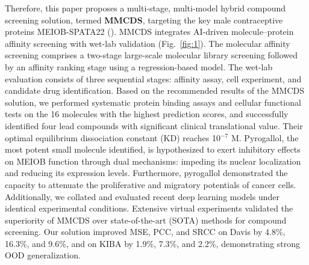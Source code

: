 \documentclass[unnumsec,webpdf,contemporary,large]{oup-authoring-template}%
\theoremstyle{thmstyleone}%
\theoremstyle{thmstyletwo}%
\theoremstyle{thmstylethree}%
\begin{document}
Therefore, this paper proposes a multi-stage, multi-model hybrid compound screening solution, termed \textbf{MMCDS}, targeting the key male contraceptive proteins MEIOB-SPATA22 (\citealt{9,15}). MMCDS integrates AI-driven molecule–protein affinity screening with wet-lab validation (Fig.~\ref{fig:1}). The molecular affinity screening comprises a two-stage large-scale molecular library screening followed by an affinity ranking stage using a regression-based model. The wet-lab evaluation consists of three sequential stages: affinity assay, cell experiment, and candidate drug identification. Based on the recommended results of the MMCDS solution, we performed systematic protein binding assays and cellular functional tests on the 16 molecules with the highest prediction scores, and successfully identified four lead compounds with significant clinical translational value. Their optimal equilibrium dissociation constant (KD) reaches 10$^{-7}$ M. Pyrogallol, the most potent small molecule identified, is hypothesized to exert inhibitory effects on MEIOB function through dual mechanisms: impeding its nuclear localization and reducing its expression levels. Furthermore, pyrogallol demonstrated the capacity to attenuate the proliferative and migratory potentials of cancer cells. Additionally, we collated and evaluated recent deep learning models under identical experimental conditions. Extensive virtual experiments validated the superiority of MMCDS over state-of-the-art (SOTA) methods for compound screening.  Our solution improved MSE, PCC, and SRCC on Davis by 4.8\%, 16.3\%, and 9.6\%, and on KIBA by 1.9\%, 7.3\%, and 2.2\%, demonstrating strong OOD generalization.

\end{document}
